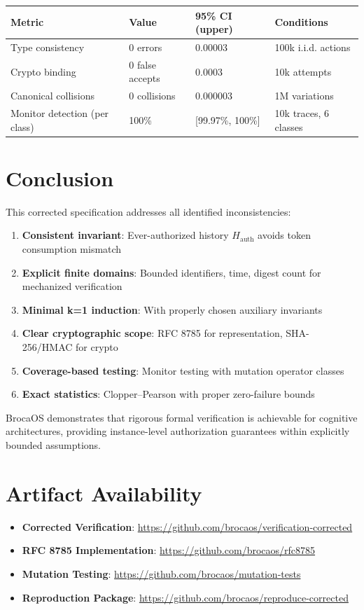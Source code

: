 \documentclass[12pt]{article}
\begin{document}
\begin{center}
\small
\begin{tabular}{@{}p{}p{}p{}p{}@{}}
\toprule
\textbf{Metric} & \textbf{Value} & \textbf{95\% CI (upper)} & \textbf{Conditions} \\
\midrule
Type consistency & 0 errors & 0.00003 & 100k i.i.d. actions \\
Crypto binding & 0 false accepts & 0.0003 & 10k attempts \\
Canonical collisions & 0 collisions & 0.000003 & 1M variations \\
Monitor detection (per class) & 100\% & [99.97\%, 100\%] & 10k traces, 6 classes \\
\bottomrule
\end{tabular}
\end{center}

\section{Conclusion}

This corrected specification addresses all identified inconsistencies:
\begin{enumerate}
    \item \textbf{Consistent invariant}: Ever-authorized history $H_{\text{auth}}$ avoids token consumption mismatch
    \item \textbf{Explicit finite domains}: Bounded identifiers, time, digest count for mechanized verification
    \item \textbf{Minimal k=1 induction}: With properly chosen auxiliary invariants
    \item \textbf{Clear cryptographic scope}: RFC 8785 for representation, SHA-256/HMAC for crypto
    \item \textbf{Coverage-based testing}: Monitor testing with mutation operator classes
    \item \textbf{Exact statistics}: Clopper--Pearson with proper zero-failure bounds
\end{enumerate}

BrocaOS demonstrates that rigorous formal verification is achievable for cognitive architectures, providing instance-level authorization guarantees within explicitly bounded assumptions.

\section*{Artifact Availability}

\begin{itemize}
    \item \textbf{Corrected Verification}: \url{https://github.com/brocaos/verification-corrected}
    \item \textbf{RFC 8785 Implementation}: \url{https://github.com/brocaos/rfc8785}
    \item \textbf{Mutation Testing}: \url{https://github.com/brocaos/mutation-tests}
    \item \textbf{Reproduction Package}: \url{https://github.com/brocaos/reproduce-corrected}
\end{itemize}
\end{document}
